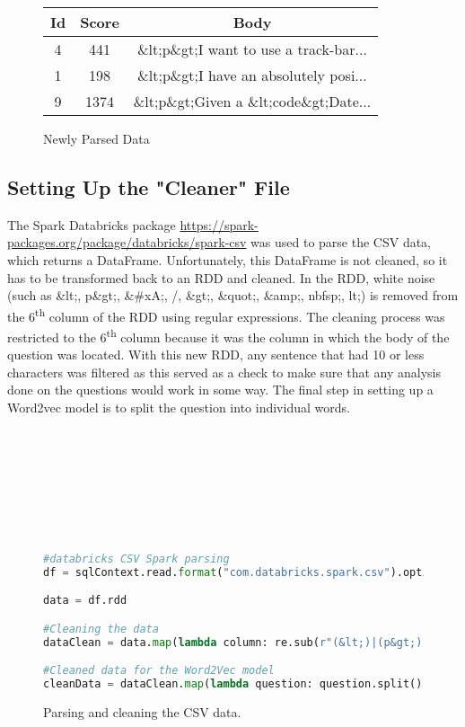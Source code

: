 \documentclass[9pt,twocolumn,twoside]{idsi}
\begin{document}
\begin{figure}[h!]
\begin{center}
\begin{tabular}{ |c|c|c| }
 \hline
 Id & Score & Body\\
 \hline
 4 & 441 & \&lt;p\&gt;I want to use a track-bar... \\
 1 & 198 & \&lt;p\&gt;I have an absolutely posi...\\
 9 & 1374 & \&lt;p\&gt;Given a \&lt;code\&gt;Date... \\
 \hline
\end{tabular}
\end{center}
\caption{Newly Parsed Data}
\end{figure}
\subsection{Setting Up the "Cleaner" File}
The Spark Databricks package \url{https://spark-packages.org/package/databricks/spark-csv}
was used to parse the CSV data, which returns a DataFrame. Unfortunately, this DataFrame is not cleaned, so it has to be transformed back to an RDD and cleaned. In the RDD,  white noise (such as \&lt;, p\&gt;, \&\#xA;, /, \&gt;, \&quot;, \&amp;, nbfsp;, lt;) is removed from the 6\textsuperscript{th} column of the RDD using regular expressions. The cleaning process was restricted to the 6\textsuperscript{th} column because it was the column in which the body of the question was located. With this new RDD, any sentence that had 10 or less characters was filtered as this served as a check to make sure that any analysis done on the questions would work in some way. 
The final step in setting up a Word2vec model is to split the question into individual words. 
\\\\\\\\\\\\\\\\
\begin{figure}[h!]

\begin{lstlisting}[language=python]
#databricks CSV Spark parsing
df = sqlContext.read.format("com.databricks.spark.csv").option("header", "true").option("inferSchema", "true").option("delimiter", '\t').load("hdfs:///shared/stackOverflow/data_formatted.csv")

data = df.rdd

#Cleaning the data
dataClean = data.map(lambda column: re.sub(r"(&lt;)|(p&gt;)|(&#xA;)|(/)|(&gt;)|(&quot;)|(&amp;)|(nbsp;)|(lt;)"," ", column[6])).filter(lambda question: len(question)>10)

#Cleaned data for the Word2Vec model
cleanData = dataClean.map(lambda question: question.split())
\end{lstlisting}
\caption{Parsing and cleaning the CSV data.}
\end{figure}
\end{document}
